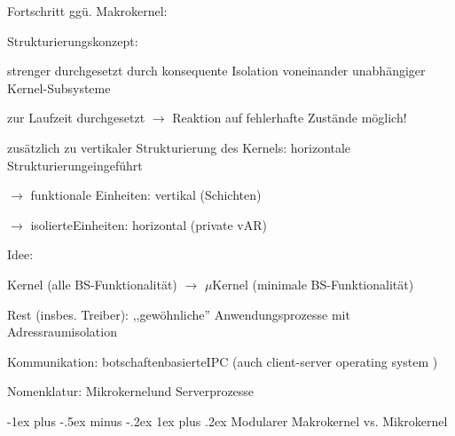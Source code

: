 \documentclass[a4paper]{article}
\makeatletter
\renewcommand{\subsubsection}{\@startsection{subsubsection}{3}{0mm}%
 {-1ex plus -.5ex minus -.2ex}%
 {1ex plus .2ex}%
 {\normalfont\small\bfseries}}
\makeatother
\begin{document}
\begin{multicols}{3}
    \begin{itemize*}
        \item Fortschritt ggü. Makrokernel:
        \begin{itemize*}
            \item Strukturierungskonzept:
            \begin{itemize*}
                \item strenger durchgesetzt durch konsequente Isolation voneinander unabhängiger Kernel-Subsysteme
                \item zur Laufzeit durchgesetzt $\rightarrow$ Reaktion auf fehlerhafte Zustände möglich!
            \end{itemize*}
            \item zusätzlich zu vertikaler Strukturierung des Kernels: horizontale Strukturierungeingeführt
            \begin{itemize*}
                \item $\rightarrow$ funktionale Einheiten: vertikal (Schichten)
                \item $\rightarrow$ isolierteEinheiten: horizontal (private vAR)
            \end{itemize*}
        \end{itemize*}
        \item
        Idee:
        \begin{itemize*}
            \item Kernel (alle BS-Funktionalität) $\rightarrow$ $\mu$Kernel (minimale BS-Funktionalität)
            \item Rest (insbes. Treiber): ,,gewöhnliche'' Anwendungsprozesse mit Adressraumisolation
            \item Kommunikation: botschaftenbasierteIPC (auch client-server operating system )
            \item Nomenklatur: Mikrokernelund Serverprozesse
        \end{itemize*}
    \end{itemize*}


    \subsubsection{Modularer Makrokernel vs.
        Mikrokernel}


\end{multicols}
\end{document}
